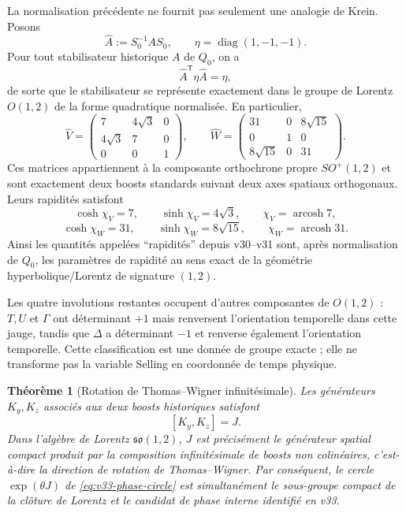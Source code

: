 \documentclass[11pt,a4paper]{article}
\newtheorem{theorem}{Théorème}[section]
\begin{document}
La normalisation précédente ne fournit pas seulement une analogie de Krein. Posons
\[
 \widehat A:=S_0^{-1}AS_0,
 \qquad
 \eta=\operatorname{diag}(1,-1,-1).
\]
Pour tout stabilisateur historique $A$ de $Q_0$, on a
\[
 \widehat A^{\mathsf T}\eta\widehat A=\eta,
\]
de sorte que le stabilisateur se représente exactement dans le groupe de Lorentz
$O(1,2)$ de la forme quadratique normalisée. En particulier,
\begin{equation}\label{eq:v33-VW-lorentz-boosts}
 \boxed{
 \widehat V=
 \begin{pmatrix}
 7&4\sqrt3&0\\
 4\sqrt3&7&0\\
 0&0&1
 \end{pmatrix},
 \qquad
 \widehat W=
 \begin{pmatrix}
 31&0&8\sqrt{15}\\
 0&1&0\\
 8\sqrt{15}&0&31
 \end{pmatrix}.}
\end{equation}
Ces matrices appartiennent à la composante orthochrone propre $SO^+(1,2)$ et sont exactement deux
boosts standards suivant deux axes spatiaux orthogonaux. Leurs rapidités satisfont
\[
 \cosh\chi_V=7,
 \qquad \sinh\chi_V=4\sqrt3,
 \qquad \chi_V=\operatorname{arcosh}7,
\]
\[
 \cosh\chi_W=31,
 \qquad \sinh\chi_W=8\sqrt{15},
 \qquad \chi_W=\operatorname{arcosh}31.
\]
Ainsi les quantités appelées ``rapidités'' depuis v30--v31 sont, après normalisation de $Q_0$,
les paramètres de rapidité au sens exact de la géométrie hyperbolique/Lorentz de signature $(1,2)$.

Les quatre involutions restantes occupent d'autres composantes de $O(1,2)$ : $T,U$ et $\Gamma$
ont déterminant $+1$ mais renversent l'orientation temporelle dans cette jauge, tandis que $\Delta$
a déterminant $-1$ et renverse également l'orientation temporelle. Cette classification est une
donnée de groupe exacte ; elle ne transforme pas la variable Selling en coordonnée de temps
physique.

\begin{theorem}[Rotation de Thomas--Wigner infinitésimale]\label{thm:v33-thomas-wigner}
Les générateurs $K_y,K_z$ associés aux deux boosts historiques satisfont
\[
 [K_y,K_z]=J.
\]
Dans l'algèbre de Lorentz $\mathfrak{so}(1,2)$, $J$ est précisément le générateur spatial compact
produit par la composition infinitésimale de boosts non colinéaires, c'est-à-dire la direction de
rotation de Thomas--Wigner. Par conséquent, le cercle $\exp(\theta J)$ de
\eqref{eq:v33-phase-circle} est simultanément le sous-groupe compact de la clôture de Lorentz et le
candidat de phase interne identifié en v33.
\end{theorem}
\end{document}
